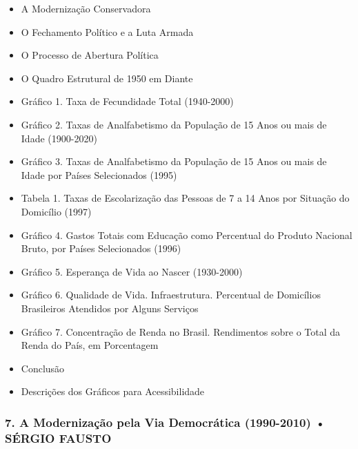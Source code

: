 \documentclass[a4paper,12pt]{article}[abntex2]
\begin{document}
\begin{itemize}
\item A Modernização Conservadora
\item O Fechamento Político e a Luta Armada
\item O Processo de Abertura Política
\item O Quadro Estrutural de 1950 em Diante
\item Gráfico 1. Taxa de Fecundidade Total (1940-2000)
\item Gráfico 2. Taxas de Analfabetismo da População de 15 Anos ou mais de Idade (1900-2020)
\item Gráfico 3. Taxas de Analfabetismo da População de 15 Anos ou mais de Idade por Países Selecionados (1995)
\item Tabela 1. Taxas de Escolarização das Pessoas de 7 a 14 Anos por Situação do Domicílio (1997)
\item Gráfico 4. Gastos Totais com Educação como Percentual do Produto Nacional Bruto, por Países Selecionados (1996)
\item Gráfico 5. Esperança de Vida ao Nascer (1930-2000)
\item Gráfico 6. Qualidade de Vida. Infraestrutura. Percentual de Domicílios Brasileiros Atendidos por Alguns Serviços
\item Gráfico 7. Concentração de Renda no Brasil. Rendimentos sobre o Total da Renda do País, em Porcentagem
\item Conclusão
\item Descrições dos Gráficos para Acessibilidade
\end{itemize}
\subsubsection*{7. A Modernização pela Via Democrática (1990-2010) • SÉRGIO FAUSTO}
\end{document}
